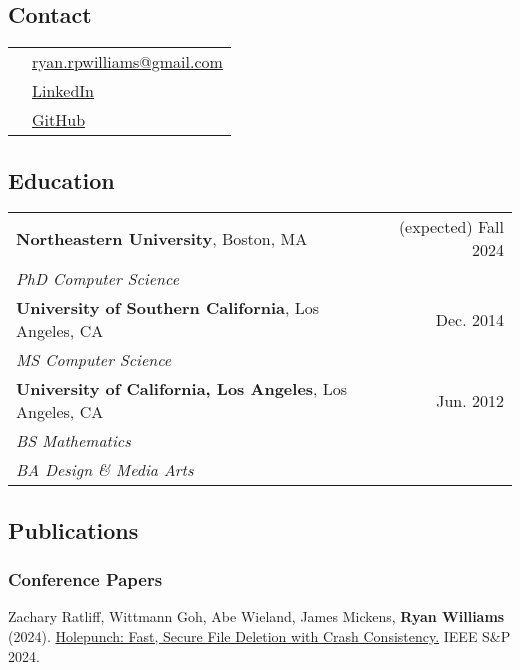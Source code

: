 \documentclass[11pt]{article}
\begin{document}

\subsection{Contact}
\label{sec:contact}

\begin{tabularx}{\textwidth}{ll}
    & \href{mailto:ryan.rpwilliams@gmail.com}{ryan.rpwilliams@gmail.com} \\
    & \href{https://www.linkedin.com/in/ryan-paul-williams}{LinkedIn} \\
    & \href{https://github.com/williamsryan}{GitHub} \\
\end{tabularx}

\subsection{Education}
\label{sec:education}

\begin{tabularx}{\textwidth}{>{\raggedright\arraybackslash}p{8cm}>{\raggedright\arraybackslash}r}
    \textbf{Northeastern University}, Boston, MA & (expected) Fall 2024 \\
    \textit{PhD Computer Science} & \\
    \textbf{University of Southern California}, Los Angeles, CA & Dec. 2014 \\
    \textit{MS Computer Science} & \\
    \textbf{University of California, Los Angeles}, Los Angeles, CA & Jun. 2012 \\
    \textit{BS Mathematics} & \\
    \textit{BA Design \& Media Arts} & \\
\end{tabularx}

\subsection{Publications}
\label{sec:publications}
\subsubsection{Conference Papers}
Zachary Ratliff, Wittmann Goh, Abe Wieland, James Mickens, \textbf{Ryan Williams} (2024).
\href{https://eprint.iacr.org/2023/1927}{Holepunch: Fast, Secure File Deletion with Crash Consistency.}
IEEE S&P 2024.
\end{document}

